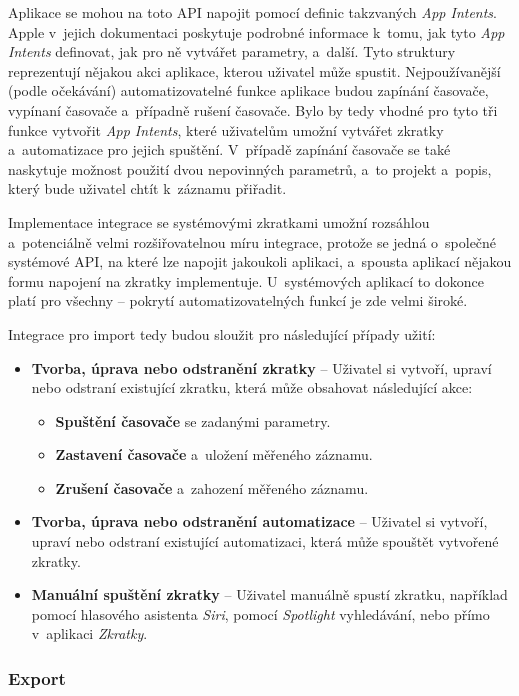 Aplikace se mohou na toto API napojit pomocí definic takzvaných \emph{App Intents}. Apple v~jejich dokumentaci \cite{ios-app-intents} poskytuje podrobné informace k~tomu, jak tyto \emph{App Intents} definovat, jak pro ně vytvářet parametry, a~další. Tyto struktury reprezentují nějakou akci aplikace, kterou uživatel může spustit. Nejpoužívanější (podle očekávání) automatizovatelné funkce aplikace budou zapínání časovače, vypínaní časovače a~případně rušení časovače. Bylo by tedy vhodné pro tyto tři funkce vytvořit \emph{App Intents}, které uživatelům umožní vytvářet zkratky a~automatizace pro jejich spuštění. V~případě zapínání časovače se také naskytuje možnost použití dvou nepovinných parametrů, a~to projekt a~popis, který bude uživatel chtít k~záznamu přiřadit.

Implementace integrace se systémovými zkratkami umožní rozsáhlou a~potenciálně velmi rozšiřovatelnou míru integrace, protože se jedná o~společné systémové API, na které lze napojit jakoukoli aplikaci, a~spousta aplikací nějakou formu napojení na zkratky implementuje. U~systémových aplikací to dokonce platí pro všechny – pokrytí automatizovatelných funkcí je zde velmi široké.

Integrace pro import tedy budou sloužit pro následující případy užití:
\begin{itemize}
\item\textbf{Tvorba, úprava nebo odstranění zkratky} – Uživatel si vytvoří, upraví nebo odstraní existující zkratku, která může obsahovat následující akce:
  \begin{itemize}
  \item\textbf{Spuštění časovače} se zadanými parametry.
  \item\textbf{Zastavení časovače} a~uložení měřeného záznamu.
  \item\textbf{Zrušení časovače} a~zahození měřeného záznamu.
  \end{itemize}
\item\textbf{Tvorba, úprava nebo odstranění automatizace} – Uživatel si vytvoří, upraví nebo odstraní existující automatizaci, která může spouštět vytvořené zkratky.
\item\textbf{Manuální spuštění zkratky} – Uživatel manuálně spustí zkratku, například pomocí hlasového asistenta \emph{Siri}, pomocí \emph{Spotlight} vyhledávání, nebo přímo v~aplikaci \emph{Zkratky}. 
\end{itemize}

\subsubsection{Export}

